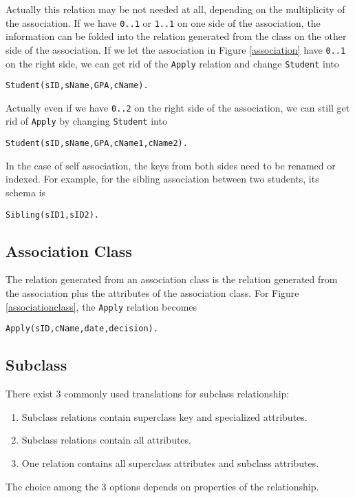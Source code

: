 Actually this relation may be not needed at all, depending on the multiplicity of the association. If we have \texttt{0..1} or \texttt{1..1} on one side of the association, the information can be folded into the relation generated from the class on the other side of the association. If we let the association in Figure \ref{association} have \texttt{0..1} on the right side, we can get rid of the \texttt{Apply} relation and change \texttt{Student} into
\begin{lstlisting}
Student(sID,sName,GPA,cName).
\end{lstlisting}
Actually even if we have \texttt{0..2} on the right side of the association, we can still get rid of \texttt{Apply} by changing \texttt{Student} into
\begin{lstlisting}
Student(sID,sName,GPA,cName1,cName2).
\end{lstlisting}
In the case of self association, the keys from both sides need to be renamed or indexed. For example, for the sibling association between two students, its schema is 
\begin{lstlisting}
Sibling(sID1,sID2).
\end{lstlisting}
\subsection{Association Class}
The relation generated from an association class is the relation generated from the association plus the attributes of the association class. For Figure \ref{associationclass}, the \texttt{Apply} relation becomes
\begin{lstlisting}
Apply(sID,cName,date,decision).
\end{lstlisting}
\subsection{Subclass}
There exist 3 commonly used translations for subclass relationship:
\begin{enumerate}
\item Subclass relations contain superclass key and specialized attributes.
\item Subclass relations contain all attributes.
\item One relation contains all superclass attributes and subclass attributes. 
\end{enumerate}
The choice among the 3 options depends on properties of the relationship. 
\ifx\PREAMBLE\undefined

\fi